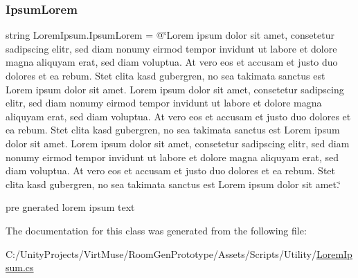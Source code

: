 \subsubsection{\texorpdfstring{Ipsum\+Lorem}{IpsumLorem}}
{\footnotesize\ttfamily string Lorem\+Ipsum.\+Ipsum\+Lorem = @\char`\"{}Lorem ipsum dolor sit amet, consetetur sadipscing elitr, sed diam nonumy eirmod tempor invidunt ut labore et dolore magna aliquyam erat, sed diam voluptua. At vero eos et accusam et justo duo dolores et ea rebum. Stet clita kasd gubergren, no sea takimata sanctus est Lorem ipsum dolor sit amet. Lorem ipsum dolor sit amet, consetetur sadipscing elitr, sed diam nonumy eirmod tempor invidunt ut labore et dolore magna aliquyam erat, sed diam voluptua. At vero eos et accusam et justo duo dolores et ea rebum. Stet clita kasd gubergren, no sea takimata sanctus est Lorem ipsum dolor sit amet. Lorem ipsum dolor sit amet, consetetur sadipscing elitr, sed diam nonumy eirmod tempor invidunt ut labore et dolore magna aliquyam erat, sed diam voluptua. At vero eos et accusam et justo duo dolores et ea rebum. Stet clita kasd gubergren, no sea takimata sanctus est Lorem ipsum dolor sit amet.\char`\"{}\hspace{0.3cm}{\ttfamily [static]}}



pre gnerated lorem ipsum text 



The documentation for this class was generated from the following file\+:\begin{DoxyCompactItemize}
\item 
C\+:/\+Unity\+Projects/\+Virt\+Muse/\+Room\+Gen\+Prototype/\+Assets/\+Scripts/\+Utility/\mbox{\hyperlink{_lorem_ipsum_8cs}{Lorem\+Ipsum.\+cs}}\end{DoxyCompactItemize}
